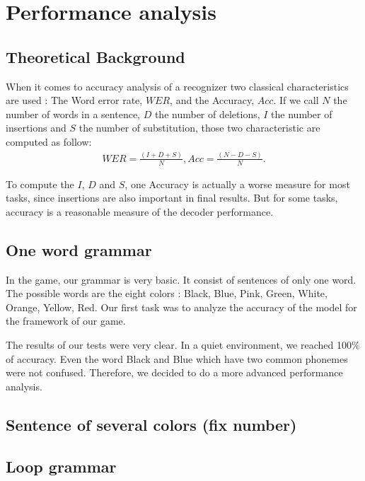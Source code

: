 \section*{Performance analysis}
\subsection*{Theoretical Background}
When it comes to accuracy analysis of a recognizer two classical characteristics are used : The Word error rate, $WER$, and the Accuracy, $Acc$. If we call $N$ the number of words in a sentence, $D$ the number of deletions, $I$ the number of insertions and $S$ the number of substitution, those two characteristic are computed as follow: 
\begin{align*}
WER = \frac{(I + D + S)}{N},
Acc = \frac{(N-D-S)}{N}.
\end{align*}

To compute the $I$, $D$ and $S$, one 
Accuracy is actually a worse measure for most tasks, since insertions are also important in final results. But for some tasks, accuracy is a reasonable measure of the decoder performance. 

\subsection*{One word grammar}
In the game, our grammar is very basic. It consist of sentences of only one word. The possible words are the eight colors : Black, Blue, Pink, Green, White, Orange, Yellow, Red. Our first task was to analyze the accuracy of the model for the framework of our game. 

The results of our tests were very clear. In a quiet environment, we reached 100\% of accuracy. Even the word Black and Blue which have two common phonemes were not confused. Therefore, we decided to do a more advanced performance analysis.   

\subsection*{Sentence of several colors (fix number)}

\subsection*{Loop grammar}
